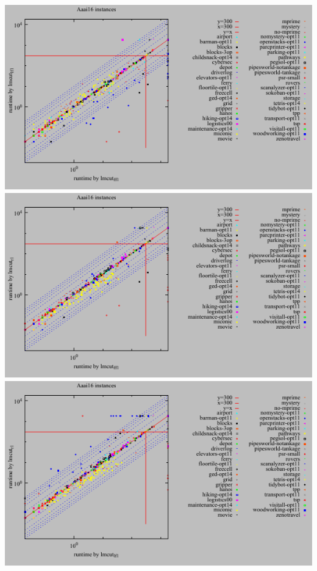 \includegraphics{tables/aaai16-time-lmcut_ff-lmcut_lf.pdf}
\linebreak
\includegraphics{tables/aaai16-time-lmcut_ff-lmcut_r.pdf}
\linebreak
\includegraphics{tables/aaai16-time-lmcut_lf-lmcut_r.pdf}
\linebreak
